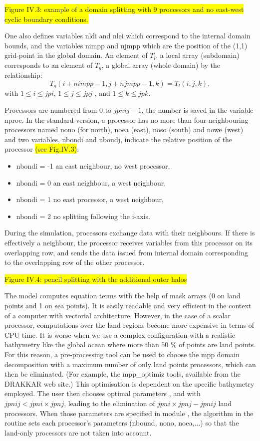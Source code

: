 \colorbox{yellow}{Figure IV.3: example of a domain splitting with 9 processors and 
no east-west cyclic boundary conditions.}

One also defines variables nldi and nlei which correspond to the internal 
domain bounds, and the variables nimpp and njmpp which are the position 
of the (1,1) grid-point in the global domain. An element of $T_{l}$, a local array 
(subdomain) corresponds to an element of $T_{g}$, a global array 
(whole domain) by the relationship: 
\begin{equation} \label{Eq_lbc_nimpp}
T_{g} (i+nimpp-1,j+njmpp-1,k) = T_{l} (i,j,k),
\end{equation}
with  $1 \leq i \leq jpi$, $1  \leq j \leq jpj $ , and  $1  \leq k \leq jpk$.

Processors are numbered from 0 to $jpnij-1$, the number is saved in the variable 
nproc. In the standard version, a processor has no more than four neighbouring 
processors named nono (for north), noea (east), noso (south) and nowe (west) 
and two variables, nbondi and nbondj, indicate the relative position of the processor 
\colorbox{yellow}{(see Fig.IV.3)}:
\begin{itemize}
\item 		nbondi = -1 	an east neighbour, no west processor,
\item 		nbondi =  0	an east neighbour, a west neighbour,
\item 		nbondi =  1 	no east processor, a west neighbour,
\item 		nbondi =  2 	no splitting following the i-axis.
\end{itemize}
During the simulation, processors exchange data with their neighbours. 
If there is effectively a neighbour, the processor receives variables from this 
processor on its overlapping row, and sends the data issued from internal 
domain corresponding to the overlapping row of the other processor.
		 
\colorbox{yellow}{Figure IV.4: pencil splitting with the additional outer halos }


The \NEMO model computes equation terms with the help of mask arrays (0 on land 
points and 1 on sea points). It is easily readable and very efficient in the context of 
a computer with vectorial architecture. However, in the case of a scalar processor, 
computations over the land regions become more expensive in terms of CPU time. 
It is worse when we use a complex configuration with a realistic bathymetry like the 
global ocean where more than 50 \% of points are land points. For this reason, a 
pre-processing tool can be used to choose the mpp domain decomposition with a 
maximum number of only land points processors, which can then be eliminated. 
(For example, the mpp\_optimiz tools, available from the DRAKKAR web site.) 
This optimisation is dependent on the specific bathymetry employed. The user 
then chooses optimal parameters ,  and  with 
$jpnij < jpni \times jpnj$, leading to the elimination of $jpni \times jpnj - jpnij$ 
land processors. When those parameters are specified in module , 
the algorithm in the  routine sets each processor's parameters (nbound, 
nono, noea,...) so that the land-only processors are not taken into account. 

